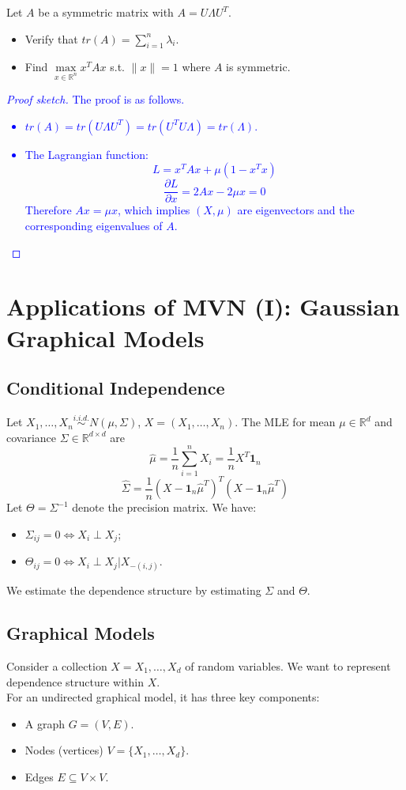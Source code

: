 \documentclass[12pt]{book}
\theoremstyle{definition}
\theoremstyle{remark}
\newcommand{\R}{\mathbb{R}}
\begin{document}
Let $A$ be a symmetric matrix with $A = U\Lambda U^T$.
\begin{itemize}
    \item Verify that $tr(A) = \sum_{i=1}^n \lambda_i$.
    \item Find $\underset{x\in\R^n}{\max}x^TAx$ s.t. $\|x\| = 1$ where $A$ is symmetric.
\end{itemize}

\textcolor{blue}{
\begin{proof}[Proof sketch]The proof is as follows.\\
\begin{itemize}
    \item $tr(A) = tr(U\Lambda U^T) = tr(U^T U\Lambda) = tr(\Lambda)$.
    \item The Lagrangian function:
    \[L = x^TAx+\mu(1-x^Tx)\]
    \[\frac{\partial L}{\partial x} = 2Ax - 2\mu x = 0\]
    Therefore $Ax = \mu x$, which implies $(X,\mu)$ are eigenvectors and the corresponding eigenvalues of $A$.
\end{itemize}
\end{proof}
}







\newpage
\section{Applications of MVN (I): Gaussian Graphical Models}
\subsection{Conditional Independence}
Let $X_1, \dots, X_n \overset{i.i.d.}{\sim} N(\mu, \Sigma)$, $X = (X_1, \dots, X_n)$. The MLE for mean $\mu \in \R^d$ and covariance $\Sigma \in \R^{d\times d}$ are 
\[\hat{\mu} = \frac{1}{n}\sum_{i=1}^n X_i = \frac{1}{n} X^T \mathbf{1}_n\]
\[\hat{\Sigma} = \frac{1}{n}(X - \mathbf{1}_n\hat{\mu}^T)^T(X - \mathbf{1}_n\hat{\mu}^T)\]
Let $\Theta = \Sigma^{-1}$ denote the precision matrix. We have:
\begin{itemize}
    \item $\Sigma_{ij} = 0 \Leftrightarrow X_i \perp X_j$;
    \item $\Theta_{ij} = 0 \Leftrightarrow X_i \perp X_j | X_{-(i,j)}$.
\end{itemize}
We estimate the dependence structure by estimating $\Sigma$ and $\Theta$.

\subsection{Graphical Models}
Consider a collection $X = X_1, \dots, X_d$ of random variables. We want to represent dependence structure within $X$.\\
For an undirected graphical model, it has three key components:
\begin{itemize}
    \item A graph \( G = (V, E) \).
    \item Nodes (vertices) \( V = \{X_1, \dots, X_d\} \).
    \item Edges \( E \subseteq V \times V \).
\end{itemize}
\end{document}
